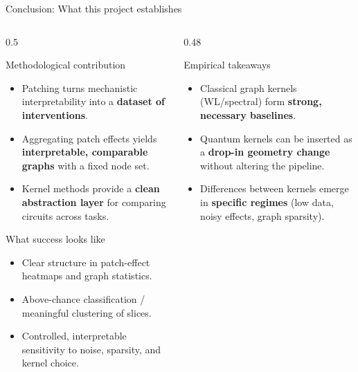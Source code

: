 \documentclass[aspectratio=169,xcolor={dvipsnames}]{beamer}
\renewcommand{\accent}[1]{\textbf{#1}}
\begin{document}
\begin{frame}[shrink=20]{Conclusion: What this project establishes}
\small
\begin{columns}[T,onlytextwidth]

\begin{column}{0.5\textwidth}
\begin{block}{Methodological contribution}
\begin{itemize}\setlength\itemsep{3pt}
\item Patching turns mechanistic interpretability into a \accent{dataset of interventions}.
\item Aggregating patch effects yields \accent{interpretable, comparable graphs} with a fixed node set.
\item Kernel methods provide a \accent{clean abstraction layer} for comparing circuits across tasks.
\end{itemize}
\end{block}

\begin{block}{What success looks like}
\begin{itemize}\setlength\itemsep{3pt}
\item Clear structure in patch-effect heatmaps and graph statistics.
\item Above-chance classification / meaningful clustering of slices.
\item Controlled, interpretable sensitivity to noise, sparsity, and kernel choice.
\end{itemize}
\end{block}
\end{column}

\begin{column}{0.48\textwidth}
\begin{block}{Empirical takeaways}
\begin{itemize}\setlength\itemsep{3pt}
\item Classical graph kernels (WL/spectral) form \accent{strong, necessary baselines}.
\item Quantum kernels can be inserted as a \accent{drop-in geometry change} without altering the pipeline.
\item Differences between kernels emerge in \accent{specific regimes} (low data, noisy effects, graph sparsity).
\end{itemize}
\end{block}


\end{column}
\end{columns}
\end{frame}
\end{document}
